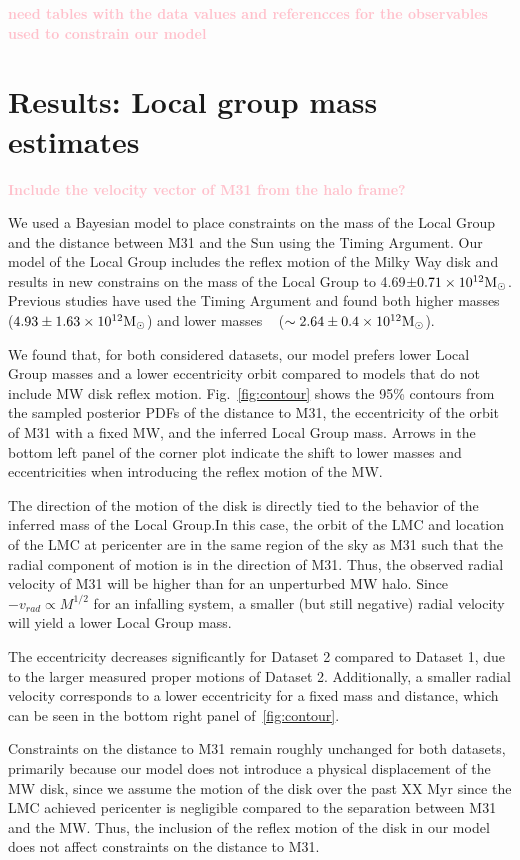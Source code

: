 \documentclass[twocolumn]{aastex631}
\newcommand{\kc}[1]{\textcolor{pink}{\textbf{#1}} }
\begin{document}
\kc{need tables with the data values and referencces for the observables used to constrain our model}

\section{Results: Local group mass estimates}
\label{sec:results}
\kc{Include the velocity vector of M31 from the halo frame?}

We used a Bayesian model to place constraints on the mass of the Local Group and the distance between M31 and the Sun using the Timing Argument. Our model of the Local Group includes the reflex motion of the Milky Way disk and results in new constrains on the mass of the Local Group to 4.69$\pm0.71 \times 10^{12}\mathrm{M}_\odot$. Previous studies have used the Timing Argument and found both higher masses~\cite{vdm2012} ($4.93\pm 1.63\times 10^{12}\mathrm{M}_\odot$) and lower masses ~\cite{Penarrubia2016} ($\sim2.64\pm0.4\times 10^{12}\mathrm{M}_\odot$). 

We found that, for both considered datasets, our model prefers lower Local Group masses and a lower eccentricity orbit compared to models that do not include MW disk reflex motion. Fig.~\ref{fig:contour} shows the 95\% contours from the sampled posterior PDFs of the distance to M31, the eccentricity of the orbit of M31 with a fixed MW, and the inferred Local Group mass. Arrows in the bottom left panel of the corner plot indicate the shift to lower masses and eccentricities when introducing the reflex motion of the MW. 

The direction of the motion of the disk is directly tied to the behavior of the inferred mass of the Local Group.In this case, the orbit of the LMC and location of the LMC at pericenter are in the same region of the sky as M31 such that the radial component of motion is in the direction of M31. Thus, the observed radial velocity of M31 will be higher than for an unperturbed MW halo. Since $-v_{rad}\propto M^{1/2}$ for an infalling system, a smaller (but still negative) radial velocity will yield a lower Local Group mass. 

The eccentricity decreases significantly for Dataset 2 compared to Dataset 1, due to the larger measured proper motions of Dataset 2.  Additionally, a smaller radial velocity corresponds to a lower eccentricity for a fixed mass and distance, which can be seen in the bottom right panel of~\ref{fig:contour}.

Constraints on the distance to M31 remain roughly unchanged for both datasets, primarily because our model does not introduce a physical displacement of the MW disk, since we assume the motion of the disk over the past XX Myr since the LMC achieved pericenter is negligible compared to the separation between M31 and the MW. Thus, the inclusion of the reflex motion of the disk in our model does not affect constraints on the distance to M31. 
\end{document}
